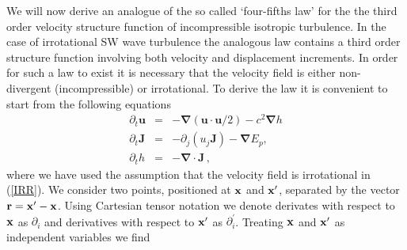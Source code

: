 \documentclass{jfm}
\providecommand\bnabla{\boldsymbol{\nabla}}
\newcommand\p{\ensuremath{\partial}}
\newcommand{\uu}{\textbf{u}}
\newcommand{\JJ}{\textbf{J}}
\begin{document}
We will now derive an analogue of the so called `four-fifths  law' \cite[]{Kolmogorov1941} for the the third order velocity structure function of incompressible isotropic turbulence.   In the case of irrotational SW wave turbulence the analogous law contains a third order structure function involving both velocity and displacement increments.  In order for such a law to exist it is necessary that the velocity field is either non-divergent (incompressible) or irrotational. To derive the law it is convenient to start from the following equations
\begin{eqnarray} \label{IRR}
\p_t \uu &=& -\bnabla  (\uu \cdot \uu /2) - c^2 \bnabla h  \\
\p_t \JJ &=& -\p_j (u_j \JJ) - \bnabla E_p,\\
\p_t h   &=& -\bnabla \cdot \JJ \, ,
\end{eqnarray}
where we have used the  assumption that the velocity field is irrotational in (\ref{IRR}). We consider two points, positioned at $ \bf x $ and $ {\bf x}^\prime $, separated by the vector $ {\bf r} = {\bf x}^\prime - {\bf x} $.
Using Cartesian tensor notation we denote derivates with respect to $ {\bf x} $ as $ \partial_i $ and derivatives with respect to $ {\bf x}^\prime $ as $ \partial^{\prime}_i $. Treating $ \bf x $ and $ {\bf x}^\prime $ as independent variables we find
\end{document}
